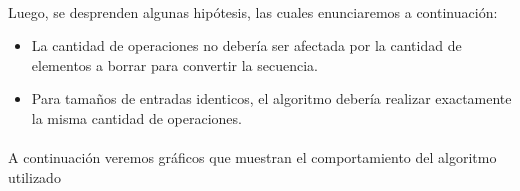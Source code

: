 \paragraph{}
Luego, se desprenden algunas hipótesis, las cuales enunciaremos a continuación:
\begin{itemize}
  
  \item La cantidad de operaciones no debería ser afectada por la cantidad de elementos a borrar para convertir la secuencia.

  \item Para tamaños de entradas identicos, el algoritmo debería realizar exactamente la misma cantidad de operaciones.

\end{itemize}




\paragraph{}
A continuación veremos gráficos que muestran el comportamiento del algoritmo utilizado

